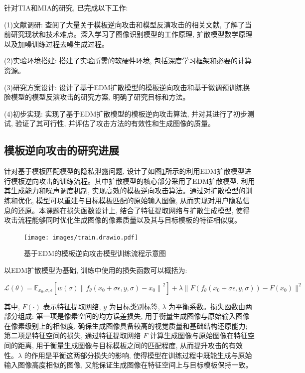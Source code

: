 针对TIA和MIA的研究, 已完成以下工作:

(1)文献调研: 查阅了大量关于模板逆向攻击和模型反演攻击的相关文献, 了解了当前研究现状和技术难点。深入学习了图像识别模型的工作原理, 扩散模型数学原理以及加噪训练过程去噪生成过程。

(2)实验环境搭建: 搭建了实验所需的软硬件环境, 包括深度学习框架和必要的计算资源。

(3)研究方案设计: 设计了基于EDM扩散模型的模板逆向攻击和基于微调预训练换脸模型的模型反演攻击的研究方案, 明确了研究目标和方法。

(4)初步实现: 实现了基于EDM扩散模型的模板逆向攻击算法, 并对其进行了初步测试, 验证了其可行性, 并评估了攻击方法的有效性和生成图像的质量。

\subsection{模板逆向攻击的研究进展}
针对基于模板匹配模型的隐私泄露问题, 设计了如图\ref{fig:edm_tia_train}所示的利用EDM扩散模型进行模板逆向攻击的训练流程。其中扩散模型的核心部分采用了EDM扩散模型, 利用其生成能力和噪声调度机制, 实现高效的模板逆向攻击算法。通过对扩散模型的训练和优化, 模型可以重建与目标模板匹配的原始输入图像, 从而实现对用户隐私信息的还原。本课题在损失函数设计上, 结合了特征提取网络与扩散生成模型, 使得攻击流程能够同时优化生成图像的像素质量以及其与目标模板的特征相似度。

\begin{figure}[!htbp]
  \centering
  \texttt{[image: images/train.drawio.pdf]}
  \caption{基于EDM的模板逆向攻击模型训练流程示意图}
  \label{fig:edm_tia_train}
\end{figure}


以EDM扩散模型为基础, 训练中使用的损失函数可以概括为:

\[
  \mathcal{L}(\theta) = \mathbb{E}_{x_0, \sigma, \epsilon} \left[ w(\sigma) \left\|  f_\theta(x_0 + \sigma \epsilon,y,\sigma) - x_0 \right\|^2 \right]
  + \lambda \| F( f_\theta(x_0 + \sigma \epsilon,y,\sigma)) - F(x_0) \|^2
\]

其中, $F(\cdot)$ 表示特征提取网络, $y$ 为目标类别标签, $\lambda$ 为平衡系数。损失函数由两部分组成: 第一项是像素空间的均方误差损失, 用于衡量生成图像与原始输入图像在像素级别上的相似度, 确保生成图像具备较高的视觉质量和基础结构还原能力; 第二项是特征空间的损失, 通过特征提取网络 $F$ 计算生成图像与原始图像在特征空间的距离, 用于衡量生成图像与目标模板之间的匹配程度, 从而提升攻击的有效性。$\lambda$ 的作用是平衡这两部分损失的影响, 使得模型在训练过程中既能生成与原始输入图像高度相似的图像, 又能保证生成图像在特征空间上与目标模板保持一致。

